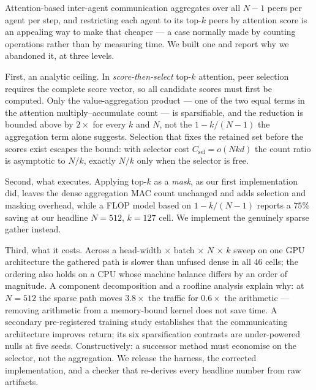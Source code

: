 Attention-based inter-agent communication aggregates over all $N-1$ peers per
agent per step, and restricting each agent to its top-$k$ peers by attention
score is an appealing way to make that cheaper --- a case normally made by
counting operations rather than by measuring time. We built one and report
why we abandoned it, at three levels.

First, an analytic ceiling. In \emph{score-then-select} top-$k$ attention, peer
selection requires the complete score vector, so all candidate scores must
first be computed. Only the value-aggregation product --- one of the two equal
terms in the attention multiply--accumulate count --- is sparsifiable, and the
reduction is bounded above by $2\times$ for every $k$ and
$N$, not the $1-k/(N-1)$ the aggregation term alone suggests. Selection that
fixes the retained set before the scores exist escapes the bound: with selector
cost $C_{\mathrm{sel}} = o(Nkd)$ the count ratio is asymptotic to $N/k$, exactly
$N/k$ only when the selector is free.

Second, what executes. Applying top-$k$ as a \emph{mask}, as our first
implementation did, leaves the dense aggregation MAC count unchanged and adds
selection and masking overhead, while a FLOP model based on $1-k/(N-1)$ reports
a $75\%$ saving at our headline $N{=}512$, $k{=}127$ cell. We implement the
genuinely sparse gather instead.

Third, what it costs. Across a head-width $\times$ batch $\times$ $N$ $\times$
$k$ sweep on one GPU architecture the gathered path is slower than unfused
dense in all $46$ cells; the ordering also holds on a CPU whose machine balance
differs by an order of magnitude. A component decomposition and a roofline
analysis explain why: at $N{=}512$ the sparse path moves $3.8\times$ the
traffic for $0.6\times$ the arithmetic --- removing arithmetic from a
memory-bound kernel does not save time. A secondary pre-registered training
study establishes that the communicating architecture improves return; its six
sparsification contrasts are under-powered nulls at five seeds.
Constructively:
a successor method must economise on the selector, not the aggregation. We
release the harness, the corrected implementation, and a checker that
re-derives every headline number from raw artifacts.
